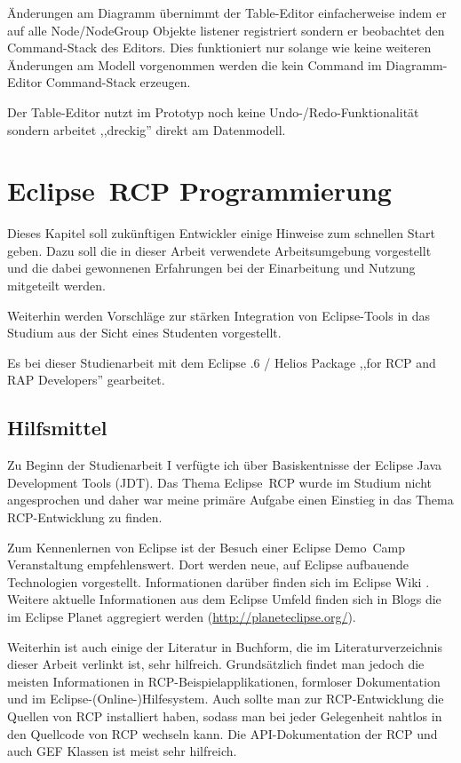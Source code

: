 \documentclass[%
12pt,titlepage,abstracton,DIV=10]{scrreprt}
\begin{document}
Änderungen am Diagramm übernimmt der Table-Editor einfacherweise indem er auf
alle Node/NodeGroup Objekte listener registriert sondern er beobachtet den
Command-Stack des Editors. Dies funktioniert nur solange wie keine weiteren
Änderungen am Modell vorgenommen werden die kein Command im Diagramm-Editor
Command-Stack erzeugen.

Der Table-Editor nutzt im Prototyp noch keine Undo-/Redo-Funktionalität sondern
arbeitet ,,dreckig'' direkt am Datenmodell.

\chapter{Eclipse~RCP Programmierung}\label{chapter:rcpprogrammierung}
Dieses Kapitel soll zukünftigen Entwickler einige Hinweise zum schnellen Start
geben. Dazu soll die in dieser Arbeit verwendete Arbeitsumgebung vorgestellt und
die dabei gewonnenen Erfahrungen bei der Einarbeitung und Nutzung mitgeteilt
werden.

Weiterhin werden Vorschläge zur stärken Integration von Eclipse-Tools in das
Studium aus der Sicht eines Studenten vorgestellt.

Es bei dieser Studienarbeit mit dem Eclipse .6 / Helios Package
,,for RCP and RAP Developers'' gearbeitet.

\section{Hilfsmittel}
Zu Beginn der Studienarbeit I verfügte ich über Basiskentnisse der Eclipse
Java Development Tools (JDT). Das Thema Eclipse~RCP wurde im Studium nicht
angesprochen und daher war meine primäre Aufgabe einen Einstieg in das Thema
RCP-Entwicklung zu finden.

Zum Kennenlernen von Eclipse ist der Besuch einer Eclipse Demo~Camp
Veranstaltung empfehlenswert. Dort werden neue, auf Eclipse aufbauende
Technologien vorgestellt. Informationen darüber finden sich im Eclipse Wiki
\cite{eclipse:wiki}. Weitere aktuelle Informationen aus dem Eclipse Umfeld
finden sich in Blogs die im Eclipse Planet aggregiert werden
(\url{http://planeteclipse.org/}).

Weiterhin ist auch einige der Literatur in Buchform, die im Literaturverzeichnis
dieser Arbeit verlinkt ist, sehr hilfreich. Grundsätzlich findet man jedoch die
meisten Informationen in RCP-Beispielapplikationen, formloser Dokumentation und
im Eclipse-(Online-)Hilfesystem. Auch sollte man zur RCP-Entwicklung die Quellen
von RCP installiert haben, sodass man bei jeder Gelegenheit nahtlos in den
Quellcode von RCP wechseln kann. Die API-Dokumentation der RCP und auch GEF
Klassen ist meist sehr hilfreich.
\end{document}
